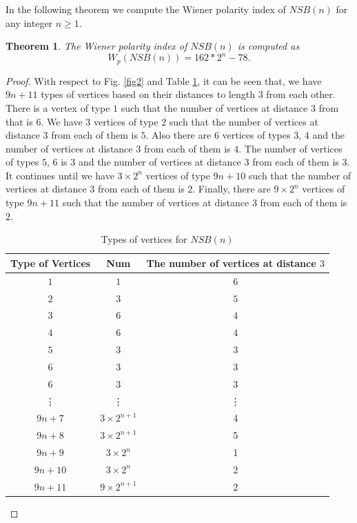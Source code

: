 \documentclass[12pt]{article}
\theoremstyle{theorem}
\newtheorem{theorem}{Theorem}
\theoremstyle{defi}
\begin{document}
In the following theorem we compute the Wiener polarity index of $NSB(n)$ for any integer $n\geq 1$.
\begin{theorem}
The Wiener polarity index of $NSB(n)$ is computed as
$$
W_p(NSB(n))= 162*2^n - 78.
$$
\end{theorem}
\begin{proof}
With respect to Fig. \ref{fig2} and Table \ref{table1}, it can be seen that, we have $9n + 11$ types of vertices based on their distances to length $3$ from each other. There is a vertex of type $1$ such that the number of vertices at distance $3$ from that is $6$. We have $3$ vertices of type $2$ such that the number of vertices at distance $3$ from each of them is $5$. Also there are $6$ vertices of types $3$, $4$ and the number of vertices at distance $3$ from each of them is $4$. The number of vertices of types $5$, $6$ is $3$ and the number of vertices at distance $3$ from each of them is $3$. It continues until we have $3\times 2^n$ vertices of type $9n + 10$ such that the number of vertices at distance $3$ from each of them is $2$. Finally, there are $9\times 2^n$ vertices of type $9n + 11$ such that the number of vertices at distance $3$ from each of them is $2$.


\begin{table}
\label{table1}
\begin{center}
\begin{tabular}{ |c|c|c| } 
 \hline
 Type of Vertices & Num & The number of vertices at distance $3$ \\\hline 
 $1$ & $1$ & $6$ \\\hline
 $2$ & $3$ & $5$ \\\hline
 $3$ & $6$ & $4$ \\\hline
 $4$ & $6$ & $4$ \\\hline
 $5$ & $3$ & $3$ \\\hline
 $6$ & $3$ & $3$ \\\hline
 $6$ & $3$ & $3$ \\\hline 
 \vdots & \vdots & \vdots \\\hline
 $9n+7$ & $3\times 2^{n+1}$ & 4\\\hline
 $9n+8$ & $3\times 2^{n+1}$ & 5 \\\hline
 $9n+9$ & $3\times 2^{n}$ & 1\\\hline
 $9n+10$ & $3\times 2^{n}$ & 2\\\hline
 $9n+11$ & $9\times 2^{n+1}$ & 2\\\hline
 \hline
\end{tabular}
\end{center}
\caption{Types of vertices for $NSB(n)$}
\end{table}


\end{proof}
\end{document}
